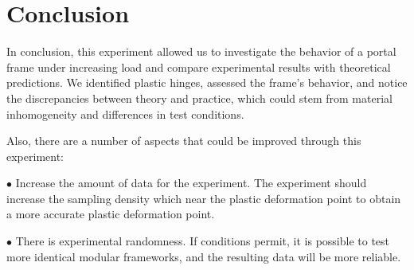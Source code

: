 \section{Conclusion}

In conclusion, this experiment allowed us to investigate the behavior of a portal frame under increasing load and compare experimental results with theoretical predictions. We identified plastic hinges, assessed the frame's behavior, and notice the discrepancies between theory and practice, which could stem from material inhomogeneity and differences in test conditions. 

Also, there are a number of aspects that could be improved through this experiment:

$\bullet$ Increase the amount of data for the experiment. The experiment should increase the sampling density which near the plastic deformation point to obtain a more accurate plastic deformation point.

$\bullet$ There is experimental randomness. If conditions permit, it is possible to test more identical modular frameworks, and the resulting data will be more reliable.
